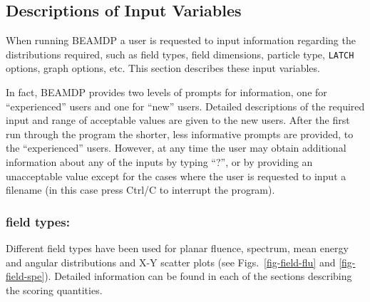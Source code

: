 \documentclass[12pt,twoside]{article}
\begin{document}
\subsection{Descriptions of Input Variables}

When running BEAMDP a user is requested to input information
regarding the distributions required, such as field types, field
dimensions, particle type, \verb+LATCH+ options, graph options, etc. This
section describes these input variables.

\noindent
In fact, BEAMDP provides two levels of prompts for information, one for
``experienced'' users and one for ``new'' users. Detailed descriptions of
the required input and range of acceptable values are given to the new
users. After the first run through the program the shorter, less
informative prompts are provided, to the ``experienced'' users. However,
at any time the user may obtain additional information about any of the
inputs by typing ``?'', or by providing an unacceptable value except for the
cases where the user is requested to input a filename (in this case press
Ctrl/C to interrupt the program).

\noindent
\subsubsection{field types:}

\noindent
Different field types have been used for planar fluence, spectrum, mean
energy and angular distributions and X-Y scatter plots
(see Figs.~\ref{fig-field-flu} and
\ref{fig-field-spe}). Detailed information can be found in each of the
sections describing the scoring quantities.
\end{document}
